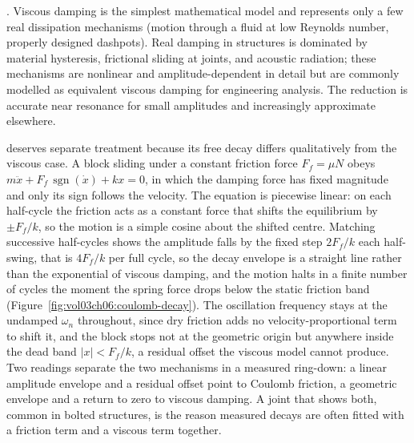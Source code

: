 . Viscous damping is the simplest
mathematical model and represents only a few real dissipation
mechanisms (motion through a fluid at low Reynolds number, properly
designed dashpots). Real damping in structures is dominated by
material hysteresis, frictional sliding at joints, and acoustic
radiation; these mechanisms are nonlinear and amplitude-dependent in
detail but are commonly modelled as equivalent viscous damping for
engineering analysis. The reduction is accurate near resonance for
small amplitudes and increasingly approximate elsewhere.

 deserves separate treatment because
its free decay differs qualitatively from the viscous case. A block
sliding under a constant friction force $F_f = \mu N$ obeys
$m\ddot{x} + F_f\,\operatorname{sgn}(\dot{x}) + kx = 0$, in which the
damping force has fixed magnitude and only its sign follows the
velocity. The equation is piecewise linear: on each half-cycle the
friction acts as a constant force that shifts the equilibrium by $\pm
F_f/k$, so the motion is a simple cosine about the shifted centre.
Matching successive half-cycles shows the amplitude falls by the fixed
step $2F_f/k$ each half-swing, that is $4F_f/k$ per full cycle, so the
decay envelope is a straight line rather than the exponential of viscous
damping, and the motion halts in a finite number of cycles the moment
the spring force drops below the static friction band
(Figure~\ref{fig:vol03ch06:coulomb-decay}). The oscillation frequency
stays at the undamped $\omega_n$ throughout, since dry friction adds no
velocity-proportional term to shift it, and the block stops not at the
geometric origin but anywhere inside the dead band $|x| < F_f/k$, a
residual offset the viscous model cannot produce. Two readings separate
the two mechanisms in a measured ring-down: a linear amplitude envelope
and a residual offset point to Coulomb friction, a geometric envelope
and a return to zero to viscous damping. A joint that shows both, common
in bolted structures, is the reason measured decays are often fitted
with a friction term and a viscous term together.

